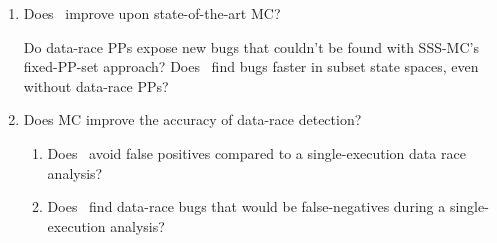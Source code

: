 \begin{enumerate}

	\item Does \quicksand~improve upon state-of-the-art MC?
		\begin{enumerate}
			\revision{\item} Do data-race PPs expose new bugs that couldn't be found with SSS-MC's fixed-PP-set approach?
			\revision{\item} Does \quicksand~find bugs faster
				in subset state spaces, even without data-race PPs?
		\end{enumerate}
	\item Does MC improve the accuracy of data-race detection?
		\begin{enumerate}
		\item Does \quicksand~avoid false positives compared to a single-execution  data race analysis?
			\item Does \quicksand~find data-race bugs that would be false-negatives during a single-execution analysis?%
		\end{enumerate}
\end{enumerate}


